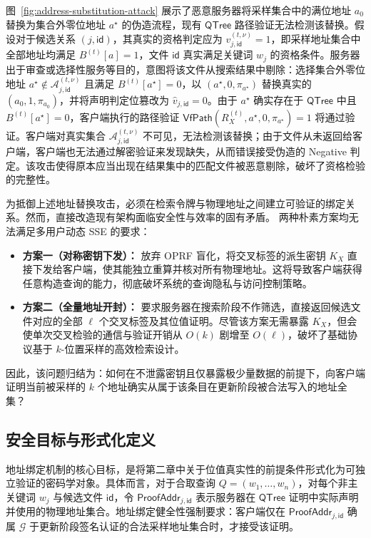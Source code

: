 图~\ref{fig:address-substitution-attack} 展示了恶意服务器将采样集合中的满位地址 $a_0$ 替换为集合外零位地址 $a^\star$ 的伪造流程，现有 $\mathsf{QTree}$ 路径验证无法检测该替换。假设对于候选关系 $(j,\mathsf{id})$，其真实的资格判定应为 $v_{j,\mathsf{id}}^{(t,\nu)}=1$，即采样地址集合中全部地址均满足 $B^{(t)}[a]=1$，文件 $\mathsf{id}$ 真实满足关键词 $w_j$ 的资格条件。服务器出于审查或选择性服务等目的，意图将该文件从搜索结果中剔除：选择集合外零位地址 $a^\star\notin\mathcal{A}_{j,\mathsf{id}}^{(t,\nu)}$ 且满足 $B^{(t)}[a^\star]=0$，以 $(a^\star,0,\pi_{a^\star})$ 替换真实的 $(a_0,1,\pi_{a_0})$，并将声明判定位篡改为 $\widehat{v}_{j,\mathsf{id}}=0$。由于 $a^\star$ 确实存在于 $\mathsf{QTree}$ 中且 $B^{(t)}[a^\star]=0$，客户端执行的路径验证 $\mathsf{VfPath}(R_X^{(t)},a^\star,0,\pi_{a^\star})=1$ 将通过验证。客户端对真实集合 $\mathcal{A}_{j,\mathsf{id}}^{(t,\nu)}$ 不可见，无法检测该替换；由于文件从未返回给客户端，客户端也无法通过解密验证来发现缺失，从而错误接受伪造的 Negative 判定。该攻击使得原本应当出现在结果集中的匹配文件被恶意剔除，破坏了资格检验的完整性。

为抵御上述地址替换攻击，必须在检索令牌与物理地址之间建立可验证的绑定关系。然而，直接改造现有架构面临安全性与效率的固有矛盾。
两种朴素方案均无法满足多用户动态 SSE 的要求：
\begin{itemize}
    \item \textbf{方案一（对称密钥下发）：} 放弃 OPRF 盲化，将交叉标签的派生密钥 $K_X$ 直接下发给客户端，使其能独立重算并核对所有物理地址。这将导致客户端获得任意构造查询的能力，彻底破坏系统的查询隐私与访问控制策略。
    \item \textbf{方案二（全量地址开封）：} 要求服务器在搜索阶段不作筛选，直接返回候选文件对应的全部 $\ell$ 个交叉标签及其位值证明。尽管该方案无需暴露 $K_X$，但会使单次交叉检验的通信与验证开销从 $O(k)$ 剧增至 $O(\ell)$，破坏了基础协议基于 $k$-位置采样的高效检索设计。
\end{itemize}

因此，该问题归结为：如何在不泄露密钥且仅暴露极少量数据的前提下，向客户端证明当前被采样的 $k$ 个地址确实从属于该条目在更新阶段被合法写入的地址全集？

\subsection{安全目标与形式化定义}\label{sec:commit-goal}
地址绑定机制的核心目标，是将第二章中关于位值真实性的前提条件形式化为可独立验证的密码学对象。具体而言，对于合取查询 $Q=(w_1,\ldots,w_n)$，对每个非主关键词 $w_j$ 与候选文件 $\mathsf{id}$，令 $\mathsf{ProofAddr}_{j,\mathsf{id}}$ 表示服务器在 $\mathsf{QTree}$ 证明中实际声明并使用的物理地址集合。地址绑定健全性强制要求：客户端仅在 $\mathsf{ProofAddr}_{j,\mathsf{id}}$ 确属 $\mathcal{G}$ 于更新阶段签名认证的合法采样地址集合时，才接受该证明。

